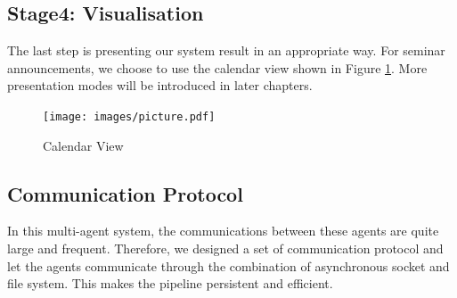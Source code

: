 \subsection{Stage4: Visualisation}
The last step is presenting our system result in an appropriate way. For seminar announcements, we choose to use the calendar view shown in Figure \ref{fig:sys:pre}. More presentation modes will be introduced in later chapters.

\begin{figure}[htb!]
	\centering
	\texttt{[image: images/picture.pdf]}
	\caption{Calendar View}\label{fig:sys:pre}
\end{figure}

\subsection{Communication Protocol}
In this multi-agent system, the communications between these agents are quite large and frequent. Therefore, we designed a set of communication protocol and let the agents communicate through the combination of asynchronous socket and file system. This makes the pipeline persistent and efficient.

